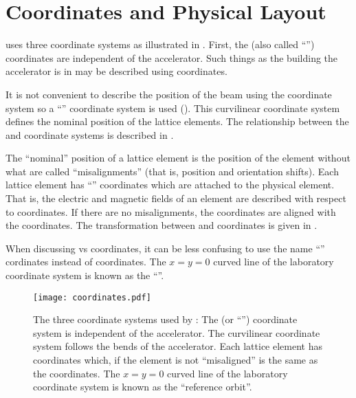 \chapter{Coordinates and Physical Layout}
\label{s:coords.3}

\vspace*{-0.3in}
\bmad uses three coordinate systems as illustrated in . First, the  (also
called ``'') coordinates are independent of the accelerator. Such things as the
building the accelerator is in may be described using  coordinates.

It is not convenient to describe the position of the beam using the  coordinate system so
a ``'' coordinate system is used ().  This curvilinear coordinate
system defines the nominal position of the lattice elements.  The relationship between the
 and  coordinate systems is described in .

The ``nominal'' position of a lattice element is the position of the element without what are called
``misalignments'' (that is, position and orientation shifts). Each lattice element has ``'' coordinates which are attached to the physical element. That is, the electric and magnetic
fields of an element are described with respect to  coordinates.  If there are no
misalignments, the  coordinates are aligned with the  coordinates. The
transformation between  and  coordinates is given in
.

When discussing  vs  coordinates, it can be less confusing to use the name
``'' cordinates instead of  coordinates. The $x=y=0$ curved line of the
laboratory coordinate system is known as the ``''.

\begin{figure}[!b]
  \centering
  \texttt{[image: coordinates.pdf]}
  \caption[The three coordinate system used by \bmad.]
{The three coordinate systems used by \bmad: The  (or ``'') coordinate system
is independent of the accelerator.  The  curvilinear coordinate system follows the bends
of the accelerator.  Each lattice element has  coordinates which, if the element is
not ``misaligned'' is the same as the  coordinates. The $x=y=0$ curved line of the
laboratory coordinate system is known as the ``reference orbit''.}
  \label{f:coords}
\end{figure}

